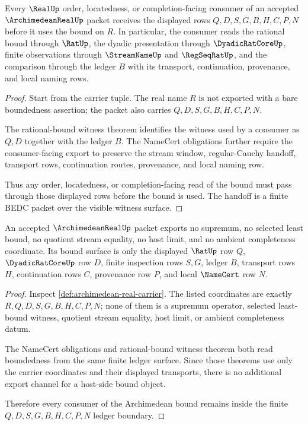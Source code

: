 \begin{theorem}
\label{thm:archimedean-real-consumer-bound-handoff}
Every $\RealUp$ order, locatedness, or completion-facing consumer of an accepted $\ArchimedeanRealUp$ packet receives the displayed rows $Q,D,S,G,B,H,C,P,N$ before it uses the bound on $R$. In particular, the consumer reads the rational bound through $\RatUp$, the dyadic presentation through $\DyadicRatCoreUp$, finite observations through $\StreamNameUp$ and $\RegSeqRatUp$, and the comparison through the ledger $B$ with its transport, continuation, provenance, and local naming rows.
\end{theorem}
\begin{proof}
Start from the carrier tuple. The real name $R$ is not exported with a bare boundedness assertion; the packet also carries $Q,D,S,G,B,H,C,P,N$.

The rational-bound witness theorem identifies the witness used by a consumer as $Q,D$ together with the ledger $B$. The NameCert obligations further require the consumer-facing export to preserve the stream window, regular-Cauchy handoff, transport rows, continuation routes, provenance, and local naming row.

Thus any order, locatedness, or completion-facing read of the bound must pass through those displayed rows before the bound is used. The handoff is a finite BEDC packet over the visible witness surface.
\end{proof}

\begin{theorem}
\label{thm:archimedean-real-bound-ledger-nonescape}
An accepted $\ArchimedeanRealUp$ packet exports no supremum, no selected least bound, no quotient stream equality, no host limit, and no ambient completeness coordinate. Its bound surface is only the displayed $\RatUp$ row $Q$, $\DyadicRatCoreUp$ row $D$, finite inspection rows $S,G$, ledger $B$, transport rows $H$, continuation rows $C$, provenance row $P$, and local $\NameCert$ row $N$.
\end{theorem}
\begin{proof}
Inspect \autoref{def:archimedean-real-carrier}. The listed coordinates are exactly $R,Q,D,S,G,B,H,C,P,N$; none of them is a supremum operator, selected least-bound witness, quotient stream equality, host limit, or ambient completeness datum.

The NameCert obligations and rational-bound witness theorem both read boundedness from the same finite ledger surface. Since those theorems use only the carrier coordinates and their displayed transports, there is no additional export channel for a host-side bound object.

Therefore every consumer of the Archimedean bound remains inside the finite $Q,D,S,G,B,H,C,P,N$ ledger boundary.
\end{proof}

